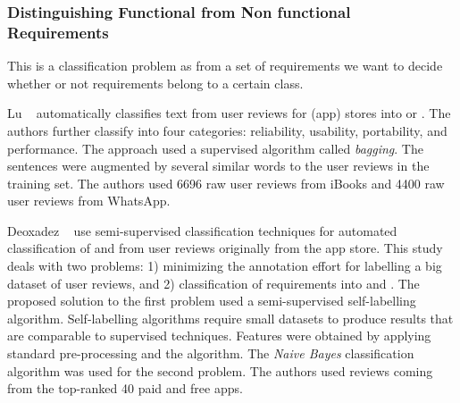 \subsubsection{Distinguishing Functional from Non functional Requirements}

This
is a classification problem as from a set of requirements we want to decide
whether or not requirements belong to a certain class. 

Lu \etal~\cite{Lu:2017} automatically classifies text from user reviews for
(app) stores into \FRs or \NFRs. The authors further classify \NFRs
into four categories: reliability, usability, portability, and
performance. The approach used a supervised algorithm called
\emph{bagging}. The sentences were augmented by several
similar words to the user reviews in the training set. The authors
used 6696 raw user reviews from iBooks and 4400 raw user reviews from WhatsApp.

Deoxadez \etal~\cite{Deocadez:2017} use semi-supervised classification
techniques for automated classification of \FR and \NFR from user reviews
originally from the app store. This study deals with two problems: 1) minimizing
the annotation effort for labelling a big dataset of user reviews, and 2)
classification of requirements into \FR and \NFR. The proposed solution to the
first problem used a semi-supervised self-labelling algorithm. Self-labelling
algorithms require small datasets to produce results that are comparable to supervised techniques.
Features were obtained by applying standard pre-processing and the \BOW
algorithm. The \emph{Naive Bayes} classification algorithm was used for the
second problem. The authors used reviews coming from the top-ranked 40 paid and
free apps.


